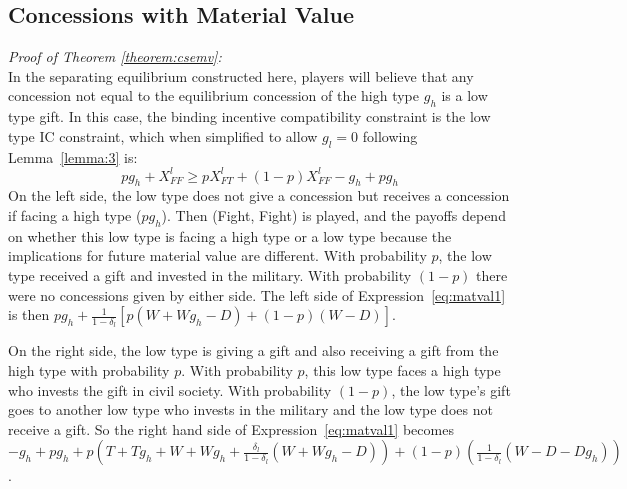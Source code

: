 \documentclass[12pt, letterpaper]{article}
\newcommand{\de}{\delta}
\begin{document}
{\subsection{Concessions with Material Value}
\emph{Proof of Theorem \ref{theorem:csemv}:}\\
In the separating equilibrium constructed here, players will believe that any concession not equal to the equilibrium concession of the high type $g_h$ is a low type gift. In this case, the binding incentive compatibility constraint is the low type IC constraint, which when simplified to allow $g_l=0$ following Lemma~\ref{lemma:3} is: 
\begin{equation}
	pg_h +X_{FF}^l \geq pX_{FT}^l+(1-p)X_{FF}^l-g_h+pg_h
	\label{eq:matval1}
\end{equation}
On the left side, the low type does not give a concession but receives a concession if facing a high type ($pg_h$). Then (Fight, Fight) is played, and the payoffs depend on whether this low type is facing a high type or a low type because the implications for future material value are different. With probability $p$, the low type received a gift and invested in the military. With probability $(1-p)$ there were no concessions given by either side. The left side of Expression~\ref{eq:matval1} is then $pg_h + \frac{1}{1-\de_l}\left[p(W+Wg_h-D) + (1-p)(W-D) \right]$.

On the right side, the low type is giving a gift and also receiving a gift from the high type with probability $p$. With probability $p$, this low type faces a high type who invests the gift in civil society. With probability $(1-p)$, the low type's gift goes to another low type who invests in the military and the low type does not receive a gift. So the right hand side of Expression~\ref{eq:matval1} becomes $-g_h + pg_h + p\left(T + Tg_h +W + Wg_h + \frac{\de_l}{1-\de_l}\left(W + Wg_h-D \right) \right) + (1-p)\left( \frac{1}{1-\de_l}\left(W-D-Dg_h \right) \right)$.

}
\end{document}
